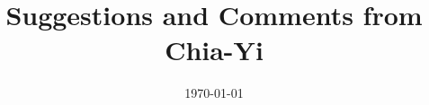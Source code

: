 \documentclass[12pt]{article}
\begin{document}
	\title{Suggestions and Comments from Chia-Yi\vspace{-1.3cm}}
	\date{\today}
	\maketitle
\end{document}
